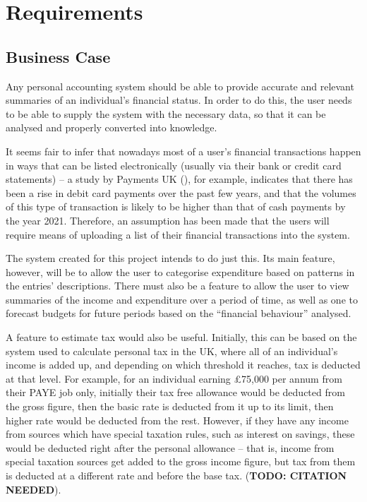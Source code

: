 \section{Requirements} \label{sec:Requirements}

\subsection{Business Case} \label{sec:Requirements.BusinessCase}
Any personal accounting system should be able to provide accurate and relevant
summaries of an individual's financial status. In order to do this, the user
needs to be able to supply the system with the necessary data, so that it can
be analysed and properly converted into knowledge.

It seems fair to infer that nowadays most of a user's financial transactions
happen in ways that can be listed electronically (usually via their bank or
credit card statements) -- a study by Payments UK
(\citeyear{paymentsUK2017summary}), for example, indicates that there has been
a rise in debit card payments over the past few years, and that the volumes of
this type of transaction is likely to be higher than that of cash payments by
the year 2021. Therefore, an assumption has been made that the users will
require means of uploading a list of their financial transactions into the
system.

The system created for this project intends to do just this. Its main feature,
however, will be to allow the user to categorise expenditure based on patterns
in the entries' descriptions. There must also be a feature to allow the user to
view summaries of the income and expenditure over a period of time, as well as
one to forecast budgets for future periods based on the ``financial behaviour''
analysed.

A feature to estimate tax would also be useful. Initially, this can be based on
the system used to calculate personal tax in the UK, where all of an
individual's income is added up, and depending on which threshold it reaches,
tax is deducted at that level. For example, for an individual earning £75,000
per annum from their PAYE job only, initially their tax free allowance would be
deducted from the gross figure, then the basic rate is deducted from it up to
its limit, then higher rate would be deducted from the rest. However, if they
have any income from sources which have special taxation rules, such as
interest on savings, these would be deducted right after the personal allowance
-- that is, income from special taxation sources get added to the gross income
figure, but tax from them is deducted at a different rate and before the base
tax. (\textbf{TODO: CITATION NEEDED}).

